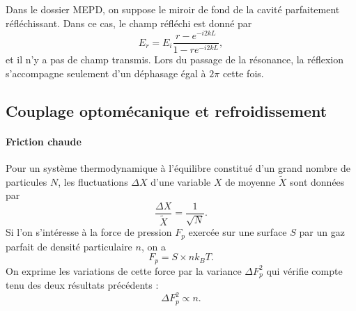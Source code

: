 \documentclass[12pt,a4paper]{article}
\begin{document}
Dans le dossier MEPD, on suppose le miroir de fond de la cavité parfaitement réfléchissant.
Dans ce cas, le champ réfléchi est donné par 
\begin{equation}
E_r = E_i \frac{r-e^{-i2kL}}{1-re^{-i2kL}},
\end{equation}
et il n'y a pas de champ transmis.
Lors du passage de la résonance, la réflexion s'accompagne seulement d'un déphasage égal à $2\pi$ cette fois.

\subsection{Couplage optomécanique et refroidissement}
\label{sec:optomechanics}

\paragraph{Friction \og chaude\fg{}\\}
Pour un système thermodynamique à l'équilibre constitué d'un grand nombre de particules $N$, les fluctuations $\Delta X$ d'une variable $X$ de moyenne $\tilde{X}$ sont données par
\begin{equation}
\frac{\Delta X}{\tilde{X}} = \frac{1}{\sqrt{N}}.
\end{equation}
Si l'on s'intéresse à la force de pression $F_p$ exercée sur une surface $S$ par un gaz parfait de densité particulaire $n$, on a
\begin{equation}
F_p = S \times n k_B T.
\end{equation}
On exprime les variations de cette force par la variance $\Delta F_p^2$ qui vérifie compte tenu des deux résultats précédents :
\begin{equation}
\Delta F_p^2 \propto n.
\end{equation}
\end{document}
